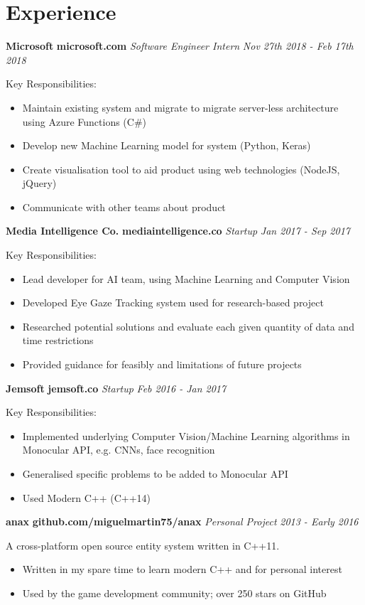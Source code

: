 \documentclass[10pt,oneside,a4paper]{article}
\newcommand{\project}[5] 
{
    {
        \textbf{#1} \hfill {\footnotesize\textbf{#2}}\newline
        \emph{#3} \hfill \emph{#4}
    }
    {
        \begin{description}[leftmargin=0.25cm, itemindent=0cm]
        \item {#5}
        \end{description}
    }
}
\newcommand{\info}[2] 
{
    \section*{#1}
    \hrulefill
    \par{#2}
}
\begin{document}
\info{Experience}
{
    {
        \project{Microsoft}{microsoft.com}{Software Engineer Intern}{Nov 27th 2018 - Feb 17th 2018}
        {
            Key Responsibilities:

            \begin{itemize}
                \item Maintain existing system and migrate to migrate server-less architecture using Azure Functions (C\#)
                \item Develop new Machine Learning model for system (Python, Keras)
                \item Create visualisation tool to aid product using web technologies (NodeJS, jQuery)
                \item Communicate with other teams about product
            \end{itemize}
        }
        \project{Media Intelligence Co.}{mediaintelligence.co}
        {Startup}{Jan 2017 - Sep 2017}
        {
            Key Responsibilities:

            \begin{itemize}
                \item Lead developer for AI team, using Machine Learning and Computer Vision
                \item Developed Eye Gaze Tracking system used for research-based project
                \item Researched potential solutions and evaluate each given quantity of data and time restrictions
                \item Provided guidance for feasibly and limitations of future projects
            \end{itemize}
        }
        \project{Jemsoft}{jemsoft.co}
        {Startup}{Feb 2016 - Jan 2017}
        {
            Key Responsibilities:

            \begin{itemize}
                \item Implemented underlying Computer Vision/Machine Learning algorithms in Monocular API, e.g. CNNs, face recognition
                \item Generalised specific problems to be added to Monocular API
                \item Used Modern C++ (C++14)
            \end{itemize}
        }
        \project{anax}{github.com/miguelmartin75/anax}
        {Personal Project}{2013 - Early 2016}
        {
            A cross-platform open source entity system written in C++11.

            \begin{itemize}
                \item Written in my spare time to learn modern C++ and for personal interest
                \item Used by the game development community; over 250 stars on GitHub
            \end{itemize}
        }
    }
}
\end{document}
